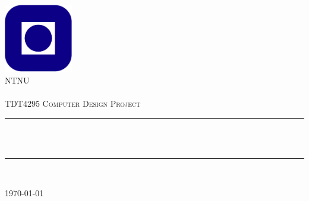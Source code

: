 \begin{titlepage}
\begin{center}
\includegraphics[height=3cm]{images/ntnu_logo.png}\\[1cm]   

\textsc{\LARGE NTNU}\\[1.5cm]

 
~\\[1.5cm]

\textsc{\Large TDT4295 Computer Design Project}\\[0.5cm]

\hrule ~\\[0.2cm]
{\huge \bfseries \mytitle}\\[0.9cm]		%
\hrule ~\\[1.5cm]

\begin{minipage}{0.4\textwidth}
    \centering
	\large
		\myauthor
\end{minipage}

\vfill

{\large \today}

\end{center}
\end{titlepage}
